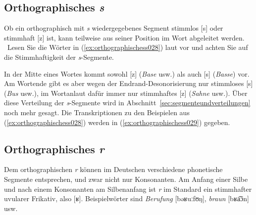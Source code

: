 \subsection{Orthographisches \textit{s}}
\label{sec:orthographischess}

Ob ein orthographisch mit \textit{s} wiedergegebenes Segment stimmlos [s] oder stimmhaft [z] ist, kann teilweise aus seiner Position im Wort abgeleitet werden.
\TuBegin~Lesen Sie die Wörter in (\ref{ex:orthographischess028}) laut vor und achten Sie auf die Stimmhaftigkeit der \textit{s}-Segmente.

\begin{exe}
  \ex\label{ex:orthographischess028}
  \begin{xlist}
  \end{xlist}
\end{exe}

In der Mitte eines Wortes kommt sowohl [z] (\textit{Base} usw.) als auch [s] (\textit{Basse}) vor.
Am Wortende gibt es aber wegen der Endrand-Desonorisierung nur stimmloses [s] (\textit{Bus} usw.), im Wortanlaut dafür immer nur stimmhaftes [z] (\textit{Sahne} usw.).
Über diese Verteilung der \textit{s}-Segmente wird in Abschnitt~\ref{sec:segmenteundverteilungen} noch mehr gesagt.
Die Transkriptionen zu den Beispielen aus (\ref{ex:orthographischess028}) werden in (\ref{ex:orthographischess029}) gegeben.

\begin{exe}
  \ex\label{ex:orthographischess029}
  \begin{xlist}
    \ex{[bʊs], [fuːs], [bəzɔndɐs]}
    \ex{[baːzə], [ʃtʁaːsə], [basə]}
    \ex{[ha͡ɛsɐ], [ha͡ɛzɐ]}
    \ex{[zaːnə], [zɔ͡əgə]}
    \ex{[ʔʊnzɐ], [ʔʊmzɪçt], [ʔalzoː]}
  \end{xlist}
\end{exe}

\subsection{Orthographisches \textit{r}}
\label{sec:orthographischesr}


Dem orthographischen \textit{r} können im Deutschen verschiedene phonetische Segmente entsprechen, und zwar nicht nur Konsonanten.
Am Anfang einer Silbe und nach einem Konsonanten am Silbenanfang ist \textit{r} im Standard ein stimmhafter uvularer Frikativ, also [ʁ].
Beispielwörter sind \textit{Berufung} [bəʁuːfʊŋ], \textit{braun} [bʁa͡ɔn] usw.

